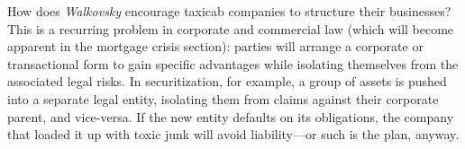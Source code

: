 \item How does \textit{Walkovsky} encourage taxicab companies to structure their
businesses? This is a recurring problem in corporate and commercial law (which
will become apparent in the mortgage crisis section): parties will arrange a
corporate or transactional form to gain specific advantages while isolating
themselves from the associated legal risks. In securitization, for example, a
group of assets is pushed into a separate legal entity, isolating them from
claims against their corporate parent, and vice-versa. If the new entity
defaults on its obligations, the company that loaded it up with toxic junk will
avoid liability---or such is the plan, anyway.

